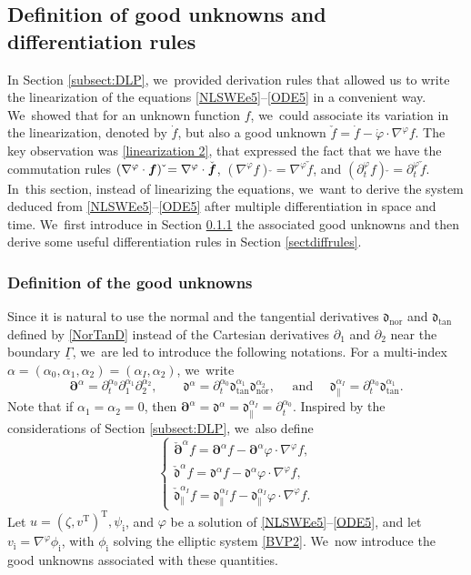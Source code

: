 \documentclass[JEP,XML,SOM,Unicode,NoFloatCountersInSection,published]{cedram}
\newcommand{\dtan}{{\mathfrak d}_\mathrm{tan}}
\newcommand{\dnor}{{\mathfrak d}_\mathrm{nor}}
\newcommand{\dpar}{{\mathfrak d}_{\parallel}}
\newcommand{\dt}{\partial_t}
\newcommand{\ul}[1]{\underline{#1}}
\newcommand{\itGamma}{\mathit{\Gamma}}
\newcommand{\cpalpha}{\check{\bm{\partial}}^{\alpha} }
\newcommand{\cmfalpha}{\check{\mathfrak{d}}^{\alpha}}
\newcommand{\cmfpalphaI}{\check{\mathfrak{d}}_{\parallel}^{\alpha_I}}
\theoremstyle{definition}
\begin{document}
\subsection{Definition of good unknowns and differentiation rules}\label{subsect:defGU}
In Section \ref{subsect:DLP}, we~provided derivation rules that allowed us to write the linearization of the equations \eqref{NLSWEe5}--\eqref{ODE5} in a convenient way. We~showed that for an unknown function $f$, we~could associate its variation in the linearization, denoted by $\dot{f}$, but also a good unknown $\check{f}=\dot{f}-\dot{\varphi}\cdot\nabla^\varphi f$.
The key observation was \eqref{linearization 2}, that expressed the fact that we have the commutation rules
$(\nabla^\varphi\cdot \mbox{\boldmath$f$})\,\check{} = \nabla^\varphi\cdot \check{\mbox{\boldmath$f$}}$, $(\nabla^\varphi f)\,\check{}
= \nabla^\varphi \check{f}$, and $(\dt^\varphi f)\,\check{} = \dt^\varphi \check{f}$. In~this section, instead of linearizing the equations, we~want to derive the system deduced from \eqref{NLSWEe5}--\eqref{ODE5} after multiple differentiation in space and time. We~first introduce in Section \ref{sectdefGU} the associated good unknowns and then derive some useful differentiation rules in Section \ref{sectdiffrules}.

\subsubsection{Definition of the good unknowns}\label{sectdefGU}
Since it is natural to use the normal and the tangential derivatives $\dnor$ and $\dtan$ defined by \eqref{NorTanD}
instead of the Cartesian derivatives $\partial_1$ and $\partial_2$ near the boundary $\ul{\itGamma}$, we~are led to introduce the following notations.
For a multi-index $\alpha=(\alpha_0,\alpha_1,\alpha_2)=(\alpha_I,\alpha_2)$, we~write
\[
\bm{\partial}^\alpha=\dt^{\alpha_0}\partial_1^{\alpha_1}\partial_2^{\alpha_2}, \qquad
\mathfrak{d}^\alpha=\dt^{\alpha_0}\dtan^{\alpha_1}\dnor^{\alpha_2},
\quad\mbox{ and } \quad
\dpar^{\alpha_I}=\dt^{\alpha_0}\dtan^{\alpha_1}.
\]
Note that if $\alpha_1=\alpha_2=0$, then $\bm{\partial}^\alpha=\mathfrak{d}^\alpha=\dpar^{\alpha_I}=\dt^{\alpha_0}$.
Inspired by the considerations of Section \ref{subsect:DLP}, we~also define
\[
\begin{cases}
\cpalpha f = \bm{\partial}^\alpha f -\bm{\partial}^\alpha\varphi\cdot \nabla^\varphi f, \\
\cmfalpha f=\mathfrak{d}^\alpha f -\mathfrak{d}^\alpha\varphi\cdot \nabla^\varphi f, \\
\cmfpalphaI f=\dpar^{\alpha_I} f -\dpar^{\alpha_I}\varphi\cdot \nabla^\varphi f.
\end{cases}
\]
Let $u=(\zeta,v^\mathrm{T})^\mathrm{T},\psi_\mathrm{i}$, and $\varphi$ be a solution of \eqref{NLSWEe5}--\eqref{ODE5},
and let $v_\mathrm{i}=\nabla^\varphi\phi_\mathrm{i}$, with $\phi_\mathrm{i}$ solving the elliptic system \eqref{BVP2}. We~now introduce the good unknowns associated with these quantities.
\end{document}
